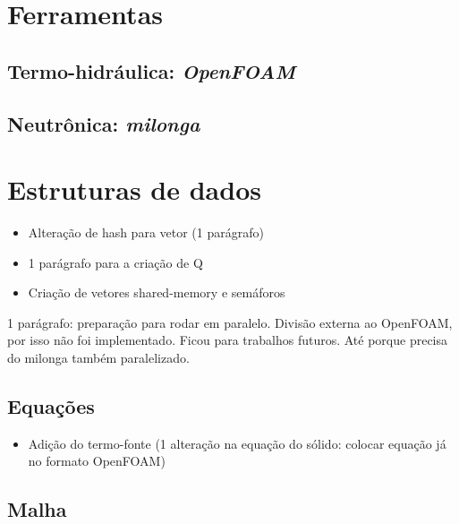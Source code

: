 \section{Ferramentas}
\label{sec:ferr}

\subsection{Termo-hidráulica: \textit{OpenFOAM}}
\label{subsection:openfoam}


\subsection{Neutrônica: \textit{milonga}}
\label{subsection:milonga}


\section{Estruturas de dados}

\begin{itemize}
\item Alteração de hash para vetor (1 parágrafo)
\item 1 parágrafo para a criação de Q
\item Criação de vetores shared-memory e semáforos
\end{itemize}

1 parágrafo: preparação para rodar em paralelo. Divisão externa ao OpenFOAM, por isso não foi
implementado. Ficou para trabalhos futuros. Até porque precisa do milonga também paralelizado.

\subsection{Equações}

\begin{itemize}
\item Adição do termo-fonte (1 alteração na equação do sólido: colocar equação já no formato OpenFOAM)
\end{itemize}

\subsection{Malha}

